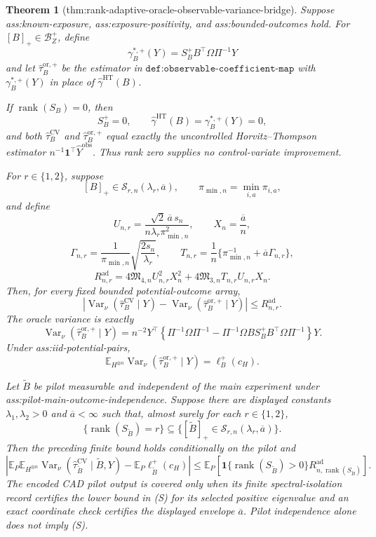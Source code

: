 \documentclass{article}
\newtheorem{theorem}{Theorem}
\begin{document}
\begin{theorem}[thm:rank-adaptive-oracle-observable-variance-bridge]\label{thm:rank-adaptive-oracle-observable-variance-bridge}
Suppose ass:known-exposure, ass:exposure-positivity, and ass:bounded-outcomes hold.  For \([B]_+\in\mathcal B_Z^+\), define
\[
\gamma_B^{*,+}(Y)=S_B^+B^{\top}\Omega\Pi^{-1}Y
\]
and let \(\widehat\tau_B^{\mathrm{or},+}\) be the estimator in \(\texttt{def:observable-coefficient-map}\) with \(\gamma_B^{*,+}(Y)\) in place of \(\widehat\gamma^{\mathrm{HT}}(B)\).

If \(\operatorname{rank}(S_B)=0\), then
\[
S_B^+=0,
\qquad
\widehat\gamma^{\mathrm{HT}}(B)=\gamma_B^{*,+}(Y)=0,
\]
and both \(\widehat\tau_B^{\mathrm{CV}}\) and \(\widehat\tau_B^{\mathrm{or},+}\) equal exactly the uncontrolled Horvitz--Thompson estimator \(n^{-1}\mathbf1^{\top}\widehat Y^{\mathrm{obs}}\).  Thus rank zero supplies no control-variate improvement.

For \(r\in\{1,2\}\), suppose
\[
[B]_+\in\mathcal S_{r,n}(\lambda_r,\overline a),
\qquad
\pi_{\min,n}=\min_{i,a}\pi_{i,a},
\]
and define
\[
U_{n,r}=\frac{\sqrt2\,\overline a\,s_n}
{n\lambda_r\pi_{\min,n}^2},
\qquad X_n=\frac{\overline a}{n},
\]
\[
\Gamma_{n,r}=\frac1{\pi_{\min,n}}
\sqrt{\frac{2s_n}{\lambda_r}},
\qquad
T_{n,r}=\frac1n\{\pi_{\min,n}^{-1}
+\overline a\Gamma_{n,r}\},
\]
\[
R_{n,r}^{\mathrm{ad}}
=4\mathfrak M_{4,n}U_{n,r}^2X_n^2
+4\mathfrak M_{3,n}T_{n,r}U_{n,r}X_n.
\]
Then, for every fixed bounded potential-outcome array,
\[
\left|\operatorname{Var}_\nu(\widehat\tau_B^{\mathrm{CV}}\mid Y)
-\operatorname{Var}_\nu(\widehat\tau_B^{\mathrm{or},+}\mid Y)\right|
\le R_{n,r}^{\mathrm{ad}}.
\]
The oracle variance is exactly
\[
\operatorname{Var}_\nu(\widehat\tau_B^{\mathrm{or},+}\mid Y)
=n^{-2}Y^{\top}\left\{\Pi^{-1}\Omega\Pi^{-1}
-\Pi^{-1}\Omega B S_B^+B^{\top}\Omega\Pi^{-1}\right\}Y.
\]
Under ass:iid-potential-pairs,
\[
\mathbb E_{H^{\otimes n}}
\operatorname{Var}_\nu(\widehat\tau_B^{\mathrm{or},+}\mid Y)
=\ell_B^+(c_H).
\]

Let \(\widetilde B\) be pilot measurable and independent of the main experiment under ass:pilot-main-outcome-independence.  Suppose there are displayed constants \(\lambda_1,\lambda_2>0\) and \(\overline a<\infty\) such that, almost surely for each \(r\in\{1,2\}\),
\[
\{\operatorname{rank}(S_{\widetilde B})=r\}
\subseteq
\{[\widetilde B]_+\in\mathcal S_{r,n}(\lambda_r,\overline a)\}.
\tag{S}
\]
Then the preceding finite bound holds conditionally on the pilot and
\[
\left|\mathbb E_P\mathbb E_{H^{\otimes n}}
\operatorname{Var}_\nu(\widehat\tau_{\widetilde B}^{\mathrm{CV}}
\mid\widetilde B,Y)
-\mathbb E_P\ell_{\widetilde B}^+(c_H)\right|
\le\mathbb E_P\!\left[
\mathbf1\{\operatorname{rank}(S_{\widetilde B})>0\}
R_{n,\operatorname{rank}(S_{\widetilde B})}^{\mathrm{ad}}
\right].
\]
The encoded CAD pilot output is covered only when its finite spectral-isolation record certifies the lower bound in (S) for its selected positive eigenvalue and an exact coordinate check certifies the displayed envelope \(\overline a\).  Pilot independence alone does not imply (S).


\end{theorem}
\end{document}
